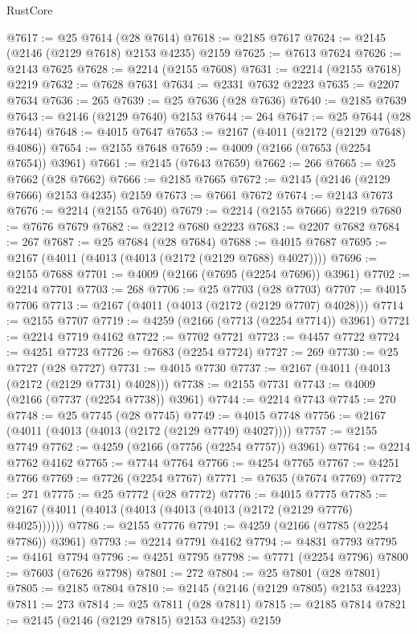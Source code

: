 \begin{lexlean}{RustCore}
\begin{coremodule}
@7617 := @25 @7614 (@28 @7614)
@7618 := @2185 @7617
@7624 := @2145 (@2146 (@2129 @7618) @2153 @4235) @2159
@7625 := @7613 @7624
@7626 := @2143 @7625
@7628 := @2214 (@2155 @7608)
@7631 := @2214 (@2155 @7618) @2219
@7632 := @7628 @7631
@7634 := @2331 @7632 @2223
@7635 := @2207 @7634
@7636 := 265
@7639 := @25 @7636 (@28 @7636)
@7640 := @2185 @7639
@7643 := @2146 (@2129 @7640) @2153
@7644 := 264
@7647 := @25 @7644 (@28 @7644)
@7648 := @4015 @7647
@7653 := @2167 (@4011 (@2172 (@2129 @7648) @4086))
@7654 := @2155 @7648
@7659 := @4009 (@2166 (@7653 (@2254 @7654)) @3961)
@7661 := @2145 (@7643 @7659)
@7662 := 266
@7665 := @25 @7662 (@28 @7662)
@7666 := @2185 @7665
@7672 := @2145 (@2146 (@2129 @7666) @2153 @4235) @2159
@7673 := @7661 @7672
@7674 := @2143 @7673
@7676 := @2214 (@2155 @7640)
@7679 := @2214 (@2155 @7666) @2219
@7680 := @7676 @7679
@7682 := @2212 @7680 @2223
@7683 := @2207 @7682
@7684 := 267
@7687 := @25 @7684 (@28 @7684)
@7688 := @4015 @7687
@7695 := @2167 (@4011 (@4013 (@4013 (@2172 (@2129 @7688) @4027))))
@7696 := @2155 @7688
@7701 := @4009 (@2166 (@7695 (@2254 @7696)) @3961)
@7702 := @2214 @7701
@7703 := 268
@7706 := @25 @7703 (@28 @7703)
@7707 := @4015 @7706
@7713 := @2167 (@4011 (@4013 (@2172 (@2129 @7707) @4028)))
@7714 := @2155 @7707
@7719 := @4259 (@2166 (@7713 (@2254 @7714)) @3961)
@7721 := @2214 @7719 @4162
@7722 := @7702 @7721
@7723 := @4457 @7722
@7724 := @4251 @7723
@7726 := @7683 (@2254 @7724)
@7727 := 269
@7730 := @25 @7727 (@28 @7727)
@7731 := @4015 @7730
@7737 := @2167 (@4011 (@4013 (@2172 (@2129 @7731) @4028)))
@7738 := @2155 @7731
@7743 := @4009 (@2166 (@7737 (@2254 @7738)) @3961)
@7744 := @2214 @7743
@7745 := 270
@7748 := @25 @7745 (@28 @7745)
@7749 := @4015 @7748
@7756 := @2167 (@4011 (@4013 (@4013 (@2172 (@2129 @7749) @4027))))
@7757 := @2155 @7749
@7762 := @4259 (@2166 (@7756 (@2254 @7757)) @3961)
@7764 := @2214 @7762 @4162
@7765 := @7744 @7764
@7766 := @4254 @7765
@7767 := @4251 @7766
@7769 := @7726 (@2254 @7767)
@7771 := @7635 (@7674 @7769)
@7772 := 271
@7775 := @25 @7772 (@28 @7772)
@7776 := @4015 @7775
@7785 := @2167 (@4011 (@4013 (@4013 (@4013 (@4013 (@2172 (@2129 @7776) @4025))))))
@7786 := @2155 @7776
@7791 := @4259 (@2166 (@7785 (@2254 @7786)) @3961)
@7793 := @2214 @7791 @4162
@7794 := @4831 @7793
@7795 := @4161 @7794
@7796 := @4251 @7795
@7798 := @7771 (@2254 @7796)
@7800 := @7603 (@7626 @7798)
@7801 := 272
@7804 := @25 @7801 (@28 @7801)
@7805 := @2185 @7804
@7810 := @2145 (@2146 (@2129 @7805) @2153 @4223)
@7811 := 273
@7814 := @25 @7811 (@28 @7811)
@7815 := @2185 @7814
@7821 := @2145 (@2146 (@2129 @7815) @2153 @4253) @2159

\end{coremodule}
\end{lexlean}

